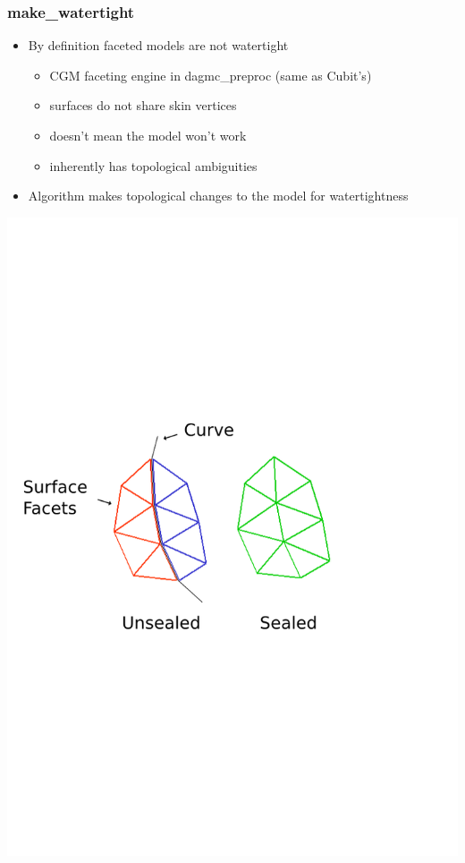 \documentclass[14pt]{beamer}
\begin{document}
\begin{frame}
\frametitle{make\_watertight}

\begin{itemize}
\vfill
\item By definition faceted models are not watertight
	\begin{itemize}
	\item CGM faceting engine in dagmc\_preproc (same as Cubit's)
	\item surfaces do not share skin vertices
	\item doesn't mean the model won't work
	\item inherently has topological ambiguities
	\end{itemize}
\vfill
\item Algorithm makes topological changes to the model for watertightness

\end{itemize}
\includegraphics[scale=0.45, trim = -100 0 0 300 ]{stitch00.png}

\end{frame}
\end{document}
